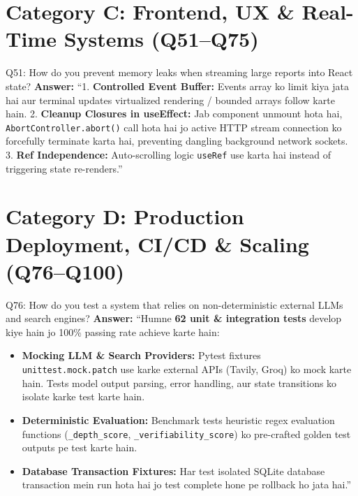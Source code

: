 \documentclass[11pt,a4paper,twoside]{report}
\begin{document}
\section{Category C: Frontend, UX \& Real-Time Systems (Q51--Q75)}

\begin{interviewbox}{Q51: How do you prevent memory leaks when streaming large reports into React state?}
\textbf{Answer:} ``1. \textbf{Controlled Event Buffer:} Events array ko limit kiya jata hai aur terminal updates virtualized rendering / bounded arrays follow karte hain.
2. \textbf{Cleanup Closures in useEffect:} Jab component unmount hota hai, \texttt{AbortController.abort()} call hota hai jo active HTTP stream connection ko forcefully terminate karta hai, preventing dangling background network sockets.
3. \textbf{Ref Independence:} Auto-scrolling logic \texttt{useRef} use karta hai instead of triggering state re-renders.''
\end{interviewbox}

\section{Category D: Production Deployment, CI/CD \& Scaling (Q76--Q100)}

\begin{interviewbox}{Q76: How do you test a system that relies on non-deterministic external LLMs and search engines?}
\textbf{Answer:} ``Humne \textbf{62 unit \& integration tests} develop kiye hain jo 100\% passing rate achieve karte hain:
\begin{itemize}
    \item \textbf{Mocking LLM \& Search Providers:} Pytest fixtures \texttt{unittest.mock.patch} use karke external APIs (Tavily, Groq) ko mock karte hain. Tests model output parsing, error handling, aur state transitions ko isolate karke test karte hain.
    \item \textbf{Deterministic Evaluation:} Benchmark tests heuristic regex evaluation functions (\texttt{\_depth\_score}, \texttt{\_verifiability\_score}) ko pre-crafted golden test outputs pe test karte hain.
    \item \textbf{Database Transaction Fixtures:} Har test isolated SQLite database transaction mein run hota hai jo test complete hone pe rollback ho jata hai.''
\end{itemize}
\end{interviewbox}


\end{document}
